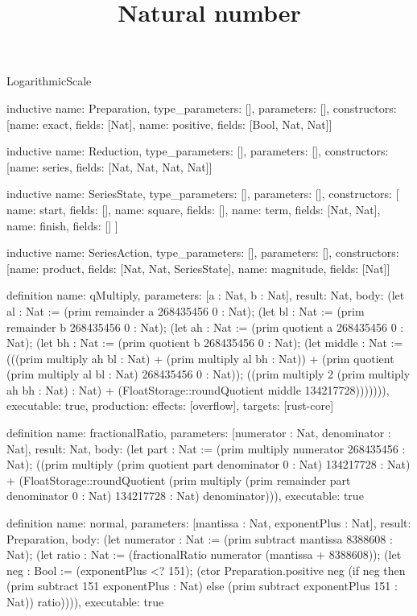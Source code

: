 \begin{lexlean}{LogarithmicScale}
\title{Natural number}
\begin{semanticmodule}
inductive{
  name: Preparation,
  type_parameters: [],
  parameters: [],
  constructors: [{name: exact, fields: [Nat]}, {name: positive, fields: [Bool, Nat, Nat]}]
}

inductive{
  name: Reduction,
  type_parameters: [],
  parameters: [],
  constructors: [{name: series, fields: [Nat, Nat, Nat, Nat]}]
}

inductive{
  name: SeriesState,
  type_parameters: [],
  parameters: [],
  constructors: [
    {name: start, fields: []},
    {name: square, fields: []},
    {name: term, fields: [Nat, Nat]},
    {name: finish, fields: []}
  ]
}

inductive{
  name: SeriesAction,
  type_parameters: [],
  parameters: [],
  constructors: [{name: product, fields: [Nat, Nat, SeriesState]}, {name: magnitude, fields: [Nat]}]
}

definition{
  name: qMultiply,
  parameters: [a : Nat, b : Nat],
  result: Nat,
  body: (let al : Nat := (prim remainder a 268435456 0 : Nat); (let bl : Nat := (prim remainder b 268435456 0 : Nat); (let ah : Nat := (prim quotient a 268435456 0 : Nat); (let bh : Nat := (prim quotient b 268435456 0 : Nat); (let middle : Nat := (((prim multiply ah bl : Nat) + (prim multiply al bh : Nat)) + (prim quotient (prim multiply al bl : Nat) 268435456 0 : Nat)); ((prim multiply 2 (prim multiply ah bh : Nat) : Nat) + (FloatStorage::roundQuotient middle 134217728))))))),
  executable: true,
  production: {effects: [overflow], targets: [rust-core]}
}

definition{
  name: fractionalRatio,
  parameters: [numerator : Nat, denominator : Nat],
  result: Nat,
  body: (let part : Nat := (prim multiply numerator 268435456 : Nat); ((prim multiply (prim quotient part denominator 0 : Nat) 134217728 : Nat) + (FloatStorage::roundQuotient (prim multiply (prim remainder part denominator 0 : Nat) 134217728 : Nat) denominator))),
  executable: true
}

definition{
  name: normal,
  parameters: [mantissa : Nat, exponentPlus : Nat],
  result: Preparation,
  body: (let numerator : Nat := (prim subtract mantissa 8388608 : Nat); (let ratio : Nat := (fractionalRatio numerator (mantissa + 8388608)); (let neg : Bool := (exponentPlus <? 151); (ctor Preparation.positive neg (if neg then (prim subtract 151 exponentPlus : Nat) else (prim subtract exponentPlus 151 : Nat)) ratio)))),
  executable: true
}


\end{semanticmodule}
\end{lexlean}
